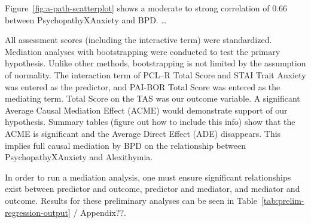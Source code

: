 \documentclass[
  man,floatsintext]{apa7}
\begin{document}
Figure~\ref{fig:a-path-scatterplot} shows a moderate to strong correlation of 0.66 between PsychopathyXAnxiety and BPD. \ldots{}

All assessment scores (including the interactive term) were standardized. Mediation analyses with bootstrapping were conducted to test the primary hypothesis. Unlike other methods, bootstrapping is not limited by the assumption of normality. The interaction term of PCL--R Total Score and STAI Trait Anxiety was entered as the predictor, and PAI-BOR Total Score was entered as the mediating term. Total Score on the TAS was our outcome variable. A significant Average Causal Mediation Effect (ACME) would demonstrate support of our hypothesis. Summary tables (figure out how to include this info) show that the ACME is significant and the Average Direct Effect (ADE) disappears. This implies full causal mediation by BPD on the relationship between PsychopathyXAnxiety and Alexithymia.

In order to run a mediation analysis, one must ensure significant relationships exist between predictor and outcome, predictor and mediator, and mediator and outcome. Results for these preliminary analyses can be seen in Table~\ref{tab:prelim-regression-output} / Appendix??.
\end{document}
